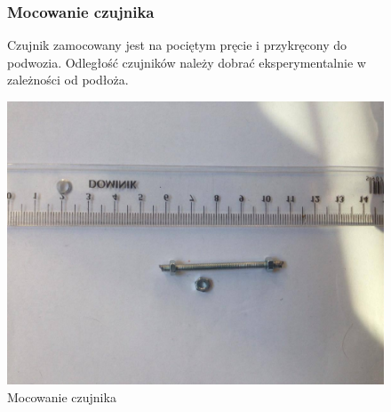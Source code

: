 \documentclass[a4paper,11pt]{article}
\def\SCALE{0.6}
\begin{document}
\begin{figure}[H]
	\subsubsection{Mocowanie czujnika}
	Czujnik zamocowany jest na pociętym pręcie i przykręcony do podwozia. Odległość czujników należy dobrać eksperymentalnie w zależności od podłoża.	

	\centering
	\includegraphics[width=\SCALE
	\paperwidth]{mocowanieCzujnika}
	\caption{Mocowanie czujnika}

\end{figure}
\end{document}
